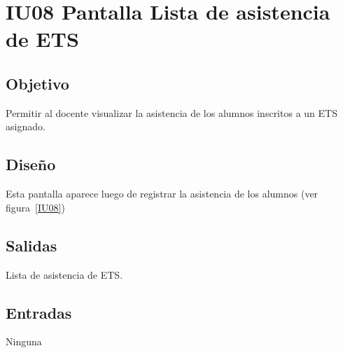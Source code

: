 \section{IU08 Pantalla Lista de asistencia de ETS}

\subsection{Objetivo}
Permitir al docente visualizar la asistencia de los alumnos inscritos a un ETS asignado.

\subsection{Diseño}
Esta pantalla aparece luego de registrar la asistencia de los alumnos  (ver figura~\ref{IU08})


\subsection{Salidas}
Lista de asistencia de ETS.

\subsection{Entradas}
Ninguna

